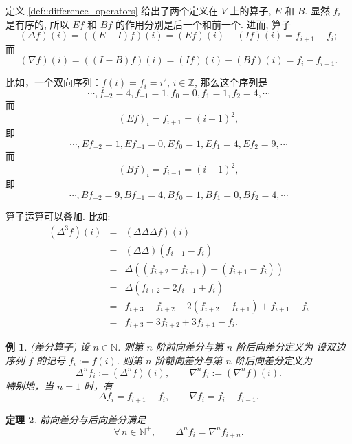 \documentclass[a4paper]{ctexart}
\newtheorem{theorem}{定理}
\newtheorem{example}[theorem]{例}
\numberwithin{theorem}{section}
\numberwithin{equation}{section}
\numberwithin{figure}{section}
\numberwithin{remark}{section}
\begin{document}
定义
\ref{def::difference_operators} 给出了两个定义在 $V$ 上的算子, $E$ 和 $B$. 显然 $f_i$ 是有序的,
所以 $Ef$ 和 $Bf$ 的作用分别是后一个和前一个. 进而, 算子
$$
(\Delta f)(i) = ((E - I) f)(i) = (E f)(i) - (I f)(i) = f_{i + 1} - f_i;
$$
而
$$
(\nabla f)(i) = ((I - B) f)(i) = (I f)(i) - (B f)(i) = f_i - f_{i - 1}.
$$

比如，一个双向序列：$f(i) = f_i = i^2$, $i \in \mathbb{Z}$, 那么这个序列是
\[
\cdots, f_{-2} = 4, f_{-1} = 1, f_0 = 0, f_1 = 1, f_2 = 4, \cdots
\]
而
\[
(Ef)_i = f_{i + 1} = (i + 1)^2,
\]
即
\[
\cdots, Ef_{-2} = 1, Ef_{-1} = 0, Ef_0 = 1, Ef_1 = 4, Ef_2 = 9, \cdots
\]
而
\[
(Bf)_i = f_{i - 1} = (i - 1)^2,
\]
即
\[
\cdots, Bf_{-2} = 9, Bf_{-1} = 4, Bf_0 = 1, Bf_1 = 0, Bf_2 = 4, \cdots
\]

算子运算可以叠加. 比如:
$$
\begin{array}{rcl}
  (\Delta^3 f)(i) &=& (\Delta \Delta \Delta f)(i) \\
  &=& (\Delta \Delta) (f_{i + 1} - f_i) \\
  &=& \Delta ((f_{i + 2} - f_{i + 1}) - (f_{i + 1} - f_i)) \\
  &=& \Delta (f_{i + 2} - 2 f_{i + 1} + f_i) \\
  &=& f_{i + 3} - f_{i + 2} - 2(f_{i + 2} - f_{i + 1}) + f_{i + 1} - f_i \\
  &=& f_{i + 3} - 3 f_{i + 2} + 3 f_{i + 1} - f_i.
\end{array}
$$

\begin{example}
    \label{exp::difference_operators}
(差分算子) 设 $n \in \mathbb{N}$. 则第 $n$ 阶前向差分与第 $n$ 阶后向差分定义为
设双边序列 $f$ 的记号 $f_i:=f(i)$. 则第 $n$ 阶前向差分与第 $n$ 阶后向差分定义为
\begin{equation}
\Delta^{n} f_i := (\Delta^{n} f)(i), \qquad \nabla^{n} f_i := (\nabla^{n} f)(i).
\end{equation}
特别地，当 $n=1$ 时，有
\begin{equation}
    \label{eq::first_difference}
\Delta f_i = f_{i+1}-f_i, \qquad \nabla f_i = f_i - f_{i-1}.
\end{equation}
\end{example}

\begin{theorem}
    \label{thm::difference_relation}
前向差分与后向差分满足
\begin{equation}
\forall\, n\in\mathbb{N}^+,\qquad \Delta^{n} f_i = \nabla^{n} f_{i+n}.
\end{equation}
\end{theorem}
\end{document}
